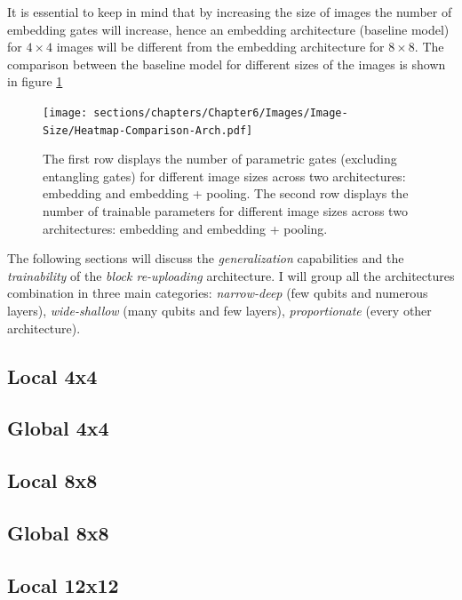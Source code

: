 It is essential to keep in mind that by increasing the size of images the number of embedding gates will
increase, hence an embedding architecture (baseline model) for $4\times4$ images will be different 
from the embedding architecture for $8\times8$.
The comparison between the baseline model for different sizes of the images is shown in figure 
\ref{arc:embed-pooling}

\begin{figure}[h]
    \centering
    \texttt{[image: sections/chapters/Chapter6/Images/Image-Size/Heatmap-Comparison-Arch.pdf]}
    \caption{The first row displays the number of parametric gates (excluding entangling gates) for 
    different image sizes across two architectures: embedding and embedding + pooling.
    The second row displays the number of trainable parameters for 
    different image sizes across two architectures: embedding and embedding + pooling.}
    \label{arc:embed-pooling}
\end{figure}


The following sections will discuss the \textit{generalization} capabilities and the 
\textit{trainability} of the \textit{block re-uploading} architecture.
I will group all the architectures combination in three main categories: \textit{narrow-deep} 
(few qubits and numerous layers), \textit{wide-shallow} (many qubits and few layers), \textit{proportionate}
(every other architecture). 


\subsection{Local 4x4}


\subsection{Global 4x4}


\subsection{Local 8x8}


\subsection{Global 8x8}


\subsection{Local 12x12}


